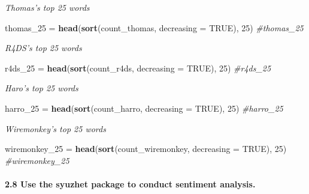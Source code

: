 \documentclass[]{article}
\newenvironment{Shaded}{\begin{snugshade}}{\end{snugshade}}
\newcommand{\CommentTok}[1]{\textcolor[rgb]{0.56,0.35,0.01}{\textit{#1}}}
\newcommand{\DataTypeTok}[1]{\textcolor[rgb]{0.13,0.29,0.53}{#1}}
\newcommand{\DecValTok}[1]{\textcolor[rgb]{0.00,0.00,0.81}{#1}}
\newcommand{\KeywordTok}[1]{\textcolor[rgb]{0.13,0.29,0.53}{\textbf{#1}}}
\newcommand{\NormalTok}[1]{#1}
\newcommand{\OtherTok}[1]{\textcolor[rgb]{0.56,0.35,0.01}{#1}}
\newcommand{\StringTok}[1]{\textcolor[rgb]{0.31,0.60,0.02}{#1}}
\let\oldparagraph\paragraph
\renewcommand{\paragraph}[1]{\oldparagraph{#1}\mbox{}}
\begin{document}
\emph{Thomas's top 25 words}

\begin{Shaded}
\begin{Highlighting}[]
\NormalTok{thomas_}\DecValTok{25}\NormalTok{ =}\StringTok{ }\KeywordTok{head}\NormalTok{(}\KeywordTok{sort}\NormalTok{(count_thomas, }\DataTypeTok{decreasing =} \OtherTok{TRUE}\NormalTok{), }\DecValTok{25}\NormalTok{)}
\CommentTok{#thomas_25}
\end{Highlighting}
\end{Shaded}

\emph{R4DS's top 25 words}

\begin{Shaded}
\begin{Highlighting}[]
\NormalTok{r4ds_}\DecValTok{25}\NormalTok{ =}\StringTok{ }\KeywordTok{head}\NormalTok{(}\KeywordTok{sort}\NormalTok{(count_r4ds, }\DataTypeTok{decreasing =} \OtherTok{TRUE}\NormalTok{), }\DecValTok{25}\NormalTok{)}
\CommentTok{#r4ds_25}
\end{Highlighting}
\end{Shaded}

\emph{Haro's top 25 words}

\begin{Shaded}
\begin{Highlighting}[]
\NormalTok{harro_}\DecValTok{25}\NormalTok{ =}\StringTok{ }\KeywordTok{head}\NormalTok{(}\KeywordTok{sort}\NormalTok{(count_harro, }\DataTypeTok{decreasing =} \OtherTok{TRUE}\NormalTok{), }\DecValTok{25}\NormalTok{)}
\CommentTok{#harro_25}
\end{Highlighting}
\end{Shaded}

\emph{Wiremonkey's top 25 words}

\begin{Shaded}
\begin{Highlighting}[]
\NormalTok{wiremonkey_}\DecValTok{25}\NormalTok{ =}\StringTok{ }\KeywordTok{head}\NormalTok{(}\KeywordTok{sort}\NormalTok{(count_wiremonkey, }\DataTypeTok{decreasing =} \OtherTok{TRUE}\NormalTok{), }\DecValTok{25}\NormalTok{)}
\CommentTok{#wiremonkey_25}
\end{Highlighting}
\end{Shaded}

\hypertarget{use-the-syuzhet-package-to-conduct-sentiment-analysis.}{%
\paragraph{2.8 Use the syuzhet package to conduct sentiment
analysis.}\label{use-the-syuzhet-package-to-conduct-sentiment-analysis.}}
\end{document}
